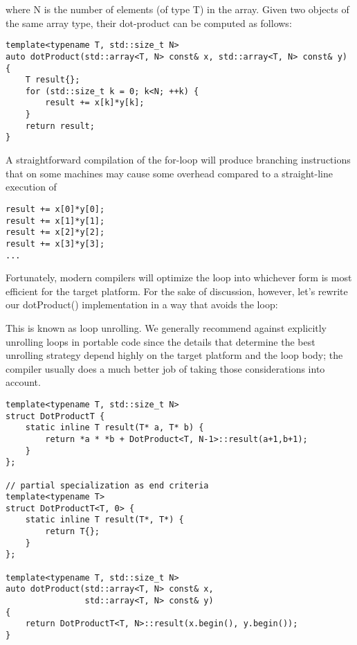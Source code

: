 where N is the number of elements (of type T) in the array. Given two objects of the same array type, their dot-product can be computed as follows:

\begin{lstlisting}[style=styleCXX]
template<typename T, std::size_t N>
auto dotProduct(std::array<T, N> const& x, std::array<T, N> const& y)
{
	T result{};
	for (std::size_t k = 0; k<N; ++k) {
		result += x[k]*y[k];
	}
	return result;
}
\end{lstlisting}

A straightforward compilation of the for-loop will produce branching instructions that on some machines may cause some overhead compared to a straight-line execution of

\begin{lstlisting}[style=styleCXX]
result += x[0]*y[0];
result += x[1]*y[1];
result += x[2]*y[2];
result += x[3]*y[3];
...
\end{lstlisting}

Fortunately, modern compilers will optimize the loop into whichever form is most efficient for the target platform. For the sake of discussion, however, let’s rewrite our dotProduct() implementation in a way that avoids the loop:

\begin{tcolorbox}[colback=webgreen!5!white,colframe=webgreen!75!black]
\hspace*{0.75cm}This is known as loop unrolling. We generally recommend against explicitly unrolling loops in portable code since the details that determine the best unrolling strategy depend highly on the target platform and the loop body; the compiler usually does a much better job of taking those considerations into account.
\end{tcolorbox}

\begin{lstlisting}[style=styleCXX]
template<typename T, std::size_t N>
struct DotProductT {
	static inline T result(T* a, T* b) {
		return *a * *b + DotProduct<T, N-1>::result(a+1,b+1);
	}
};

// partial specialization as end criteria
template<typename T>
struct DotProductT<T, 0> {
	static inline T result(T*, T*) {
		return T{};
	}
};

template<typename T, std::size_t N>
auto dotProduct(std::array<T, N> const& x,
				std::array<T, N> const& y)
{
	return DotProductT<T, N>::result(x.begin(), y.begin());
}
\end{lstlisting}

